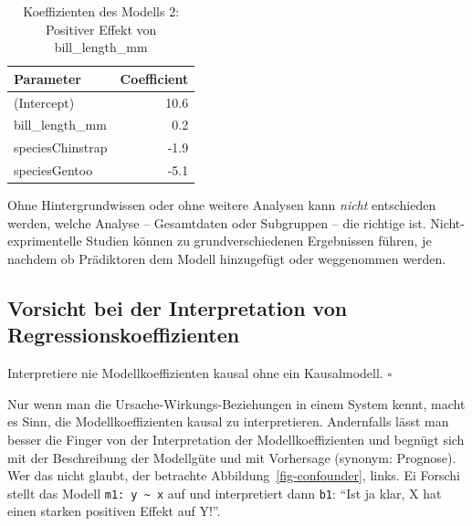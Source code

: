 \documentclass[
  letterpaper,
  oneside,
  open=any]{scrbook}
\theoremstyle{definition}
\theoremstyle{definition}
\theoremstyle{definition}
\theoremstyle{remark}
\begin{document}
\begin{longtable}[]{@{}lr@{}}

\caption{\label{tbl-peng-simpson2}Koeffizienten des Modells 2: Positiver
Effekt von bill\_length\_mm}

\tabularnewline

\toprule\noalign{}
Parameter & Coefficient \\
\midrule\noalign{}
\endhead
\bottomrule\noalign{}
\endlastfoot
(Intercept) & 10.6 \\
bill\_length\_mm & 0.2 \\
speciesChinstrap & -1.9 \\
speciesGentoo & -5.1 \\

\end{longtable}

Ohne Hintergrundwissen oder ohne weitere Analysen kann \emph{nicht}
entschieden werden, welche Analyse -- Gesamtdaten oder Subgruppen -- die
richtige ist. Nicht-exprimentelle Studien können zu grundverschiedenen
Ergebnissen führen, je nachdem ob Prädiktoren dem Modell hinzugefügt
oder weggenommen werden.

\subsection{Vorsicht bei der Interpretation von
Regressionskoeffizienten}\label{vorsicht-bei-der-interpretation-von-regressionskoeffizienten}

\begin{tcolorbox}[enhanced jigsaw, bottomrule=.15mm, left=2mm, colbacktitle=quarto-callout-important-color!10!white, bottomtitle=1mm, colframe=quarto-callout-important-color-frame, coltitle=black, rightrule=.15mm, breakable, toptitle=1mm, titlerule=0mm, title=\textcolor{quarto-callout-important-color}{\faExclamation}\hspace{0.5em}{Wichtig}, opacitybacktitle=0.6, arc=.35mm, colback=white, leftrule=.75mm, opacityback=0, toprule=.15mm]

Interpretiere nie Modellkoeffizienten kausal ohne ein Kausalmodell.
\(\square\)

\end{tcolorbox}

Nur wenn man die Ursache-Wirkungs-Beziehungen in einem System kennt,
macht es Sinn, die Modellkoeffizienten kausal zu interpretieren.
Andernfalls lässt man besser die Finger von der Interpretation der
Modellkoeffizienten und begnügt sich mit der Beschreibung der Modellgüte
und mit Vorhersage (synonym: Prognose). Wer das nicht glaubt, der
betrachte Abbildung~\ref{fig-confounder}, links. Ei Forschi stellt das
Modell \texttt{m1:\ y\ \textasciitilde{}\ x} auf und interpretiert dann
\texttt{b1}: \enquote{Ist ja klar, X hat einen starken positiven Effekt
auf Y!}.
\end{document}

